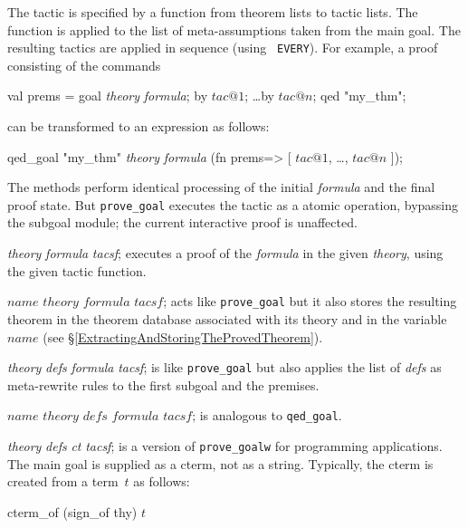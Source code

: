 The tactic is specified by a function from theorem lists to tactic lists.
The function is applied to the list of meta-assumptions taken from
the main goal.  The resulting tactics are applied in sequence (using {\tt
  EVERY}).  For example, a proof consisting of the commands
\begin{ttbox} 
val prems = goal {\it theory} {\it formula};
by \(tac@1\);  \ldots  by \(tac@n\);
qed "my_thm";
\end{ttbox}
can be transformed to an expression as follows:
\begin{ttbox} 
qed_goal "my_thm" {\it theory} {\it formula}
 (fn prems=> [ \(tac@1\), \ldots, \(tac@n\) ]);
\end{ttbox}
The methods perform identical processing of the initial {\it formula} and
the final proof state.  But \texttt{prove_goal} executes the tactic as a
atomic operation, bypassing the subgoal module; the current interactive
proof is unaffected.
%
\begin{ttdescription}
\item[\ttindexbold{prove_goal} {\it theory} {\it formula} {\it tacsf};] 
executes a proof of the {\it formula\/} in the given {\it theory}, using
the given tactic function.

\item[\ttindexbold{qed_goal} $name$ $theory$ $formula$ $tacsf$;] acts
  like \texttt{prove_goal} but it also stores the resulting theorem in the
  theorem database associated with its theory and in the {\ML}
  variable $name$ (see \S\ref{ExtractingAndStoringTheProvedTheorem}).

\item[\ttindexbold{prove_goalw} {\it theory} {\it defs} {\it formula} 
      {\it tacsf};]
is like \texttt{prove_goal} but also applies the list of {\it defs\/} as
meta-rewrite rules to the first subgoal and the premises.

\item[\ttindexbold{qed_goalw} $name$ $theory$ $defs$ $formula$ $tacsf$;]
is analogous to \texttt{qed_goal}.

\item[\ttindexbold{prove_goalw_cterm} {\it theory} {\it defs} {\it ct}
      {\it tacsf};] 
is a version of \texttt{prove_goalw} for programming applications.  The main
goal is supplied as a cterm, not as a string.  Typically, the cterm is
created from a term~$t$ as follows:
\begin{ttbox}
cterm_of (sign_of thy) \(t\)
\end{ttbox}
\end{ttdescription}


